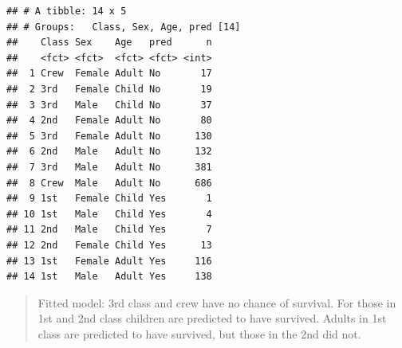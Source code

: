 \documentclass[]{article}
\newenvironment{Shaded}{\begin{snugshade}}{\end{snugshade}}
\newcommand{\DecValTok}[1]{\textcolor[rgb]{0.00,0.00,0.81}{#1}}
\newcommand{\FloatTok}[1]{\textcolor[rgb]{0.00,0.00,0.81}{#1}}
\newcommand{\KeywordTok}[1]{\textcolor[rgb]{0.13,0.29,0.53}{\textbf{#1}}}
\newcommand{\NormalTok}[1]{#1}
\newcommand{\OperatorTok}[1]{\textcolor[rgb]{0.81,0.36,0.00}{\textbf{#1}}}
\newcommand{\StringTok}[1]{\textcolor[rgb]{0.31,0.60,0.02}{#1}}
\begin{document}
\begin{Shaded}
\end{Shaded}

\begin{verbatim}
## # A tibble: 14 x 5
## # Groups:   Class, Sex, Age, pred [14]
##    Class Sex    Age   pred      n
##    <fct> <fct>  <fct> <fct> <int>
##  1 Crew  Female Adult No       17
##  2 3rd   Female Child No       19
##  3 3rd   Male   Child No       37
##  4 2nd   Female Adult No       80
##  5 3rd   Female Adult No      130
##  6 2nd   Male   Adult No      132
##  7 3rd   Male   Adult No      381
##  8 Crew  Male   Adult No      686
##  9 1st   Female Child Yes       1
## 10 1st   Male   Child Yes       4
## 11 2nd   Male   Child Yes       7
## 12 2nd   Female Child Yes      13
## 13 1st   Female Adult Yes     116
## 14 1st   Male   Adult Yes     138
\end{verbatim}

\begin{quote}
Fitted model: 3rd class and crew have no chance of survival. For those
in 1st and 2nd class children are predicted to have survived. Adults in
1st class are predicted to have survived, but those in the 2nd did not.
\end{quote}
\end{document}
